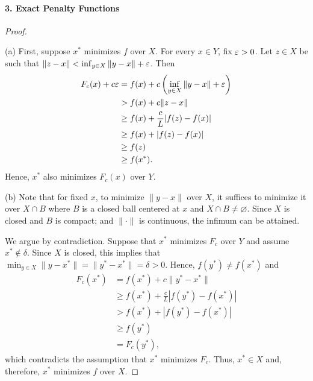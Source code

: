   \paragraph{3. Exact Penalty Functions}
  \begin{proof}
    $\,$\par
    (a) First, suppose $x^*$ minimizes $f$ over $X$. For every $x\in Y$, fix
    $\varepsilon>0$. Let $z\in X$ be such that $\|z-x\|<\inf_{y\in X}\|y-x\|+\varepsilon$.
    Then
    \begin{align*}
      F_c(x)+c\varepsilon
      &=f(x)+c\left(\inf_{y\in X}\|y-x\|+\varepsilon\right)\\
      &>f(x)+c\|z-x\|\\
      &\ge f(x)+\frac{c}{L}|f(z)-f(x)|\\
      &\ge f(x)+|f(z)-f(x)|\\
      &\ge f(z)\\
      &\ge f(x^*).
    \end{align*}
    Hence, $x^*$ also minimizes $F_c(x)$ over $Y$. \par
    (b) Note that for fixed $x$, to minimize $\|y-x\|$ over $X$, it suffices
    to minimize it over $X\cap B$ where $B$ is a closed ball centered at $x$
    and $X\cap B\ne\varnothing$. Since $X$ is closed and $B$ is compact; and
    $\|\cdot\|$ is continuous, the infimum can be attained.\par
    We argue by contradiction. Suppose that $x^*$ minimizes $F_c$ over $Y$
    and assume $x^*\notin\delta$. Since $X$ is closed, this implies that 
    $\min_{y\in X}\|y-x^*\|=\|y^*-x^*\|=\delta>0$. Hence, $f(y^*)\ne f(x^*)$ 
    and
    \begin{align*}
      F_c(x^*)
      &=f(x^*)+c\|y^*-x^*\|\\
      &\ge f(x^*)+\frac{c}{L}|f(y^*)-f(x^*)|\\
      &>f(x^*)+|f(y^*)-f(x^*)|\\
      &\ge f(y^*)\\
      &=F_c(y^*),
    \end{align*}
    which contradicts the assumption that $x^*$ minimizes $F_c$. Thus, $x^*
    \in X$ and, therefore, $x^*$ minimizes $f$ over $X$.
  \end{proof}










